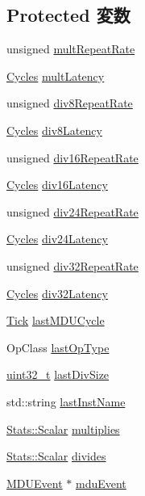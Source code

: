 \subsection*{Protected 変数}
\begin{DoxyCompactItemize}
\item 
unsigned \hyperlink{classMultDivUnit_a1871d85be78df55fa08769481a3d3d4e}{multRepeatRate}
\item 
\hyperlink{classCycles}{Cycles} \hyperlink{classMultDivUnit_a3de390a21e916001149c87429bf1e217}{multLatency}
\item 
unsigned \hyperlink{classMultDivUnit_a91461263fab8dd281b183c701f4cbbe1}{div8RepeatRate}
\item 
\hyperlink{classCycles}{Cycles} \hyperlink{classMultDivUnit_abec03f1964c506077d736637cceae467}{div8Latency}
\item 
unsigned \hyperlink{classMultDivUnit_a1c025245df3142725ae1dd58d13168d8}{div16RepeatRate}
\item 
\hyperlink{classCycles}{Cycles} \hyperlink{classMultDivUnit_a68408b696b715c2a6d468f16451a4c98}{div16Latency}
\item 
unsigned \hyperlink{classMultDivUnit_a0e2f13b87db0c3e86b59d16cfb2ed40c}{div24RepeatRate}
\item 
\hyperlink{classCycles}{Cycles} \hyperlink{classMultDivUnit_a03f6d4fc8fa7ddd3d383f57f0c9e3a64}{div24Latency}
\item 
unsigned \hyperlink{classMultDivUnit_aa536f733081397edefcc94501c5e79a6}{div32RepeatRate}
\item 
\hyperlink{classCycles}{Cycles} \hyperlink{classMultDivUnit_abbe7306bdfa2d1da4d51db2c3618214d}{div32Latency}
\item 
\hyperlink{base_2types_8hh_a5c8ed81b7d238c9083e1037ba6d61643}{Tick} \hyperlink{classMultDivUnit_a59ab9df8fd6e708fee0ecd5088fdd42d}{lastMDUCycle}
\item 
OpClass \hyperlink{classMultDivUnit_a062c172670b1305b3cad0920b002e8a2}{lastOpType}
\item 
\hyperlink{Type_8hh_a435d1572bf3f880d55459d9805097f62}{uint32\_\-t} \hyperlink{classMultDivUnit_a075ef274f01d991e6536962af9c769b3}{lastDivSize}
\item 
std::string \hyperlink{classMultDivUnit_a1996f8a5fafe7c1b2a1c0ffb643dbcf3}{lastInstName}
\item 
\hyperlink{classStats_1_1Scalar}{Stats::Scalar} \hyperlink{classMultDivUnit_a93c0b82f201329738735dced68546cbc}{multiplies}
\item 
\hyperlink{classStats_1_1Scalar}{Stats::Scalar} \hyperlink{classMultDivUnit_af00ce09d1fb90b720ca50018e34ad41b}{divides}
\item 
\hyperlink{classMDUEvent}{MDUEvent} $\ast$ \hyperlink{classMultDivUnit_ab6780ac541ff360807ea8d60676f16ed}{mduEvent}
\end{DoxyCompactItemize}


